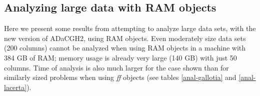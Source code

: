 \documentclass[a4paper,11pt]{article}
\begin{document}
\clearpage
\subsection{Analyzing large data with RAM objects}
\label{ramobj}
Here we present some results from attempting to analyze large data sets,
with the new version of ADaCGH2, using RAM objects. Even moderately size
data sets (200 columns) cannot be analyzed when using RAM objects in a
machine with 384 GB of RAM; memory usage is already very large (140 GB)
with just 50 columns. Time of analysis is also much larger for the case
shown than for similarly sized problems when using \textit{ff} objects
(see tables \ref{anal-gallotia} and \ref{anal-lacerta}).





\renewcommand{\arraystretch}{1.4}
\end{document}
